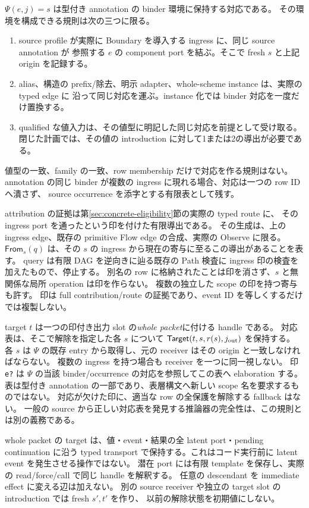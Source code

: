 \documentclass[11pt,a4paper]{article}
\begin{document}
\(\Psi(e,j)=s\) は型付き annotation の binder 環境に保持する対応である。
その環境を構成できる規則は次の三つに限る。
\begin{enumerate}
\item source profile が実際に Boundary を導入する ingress に、同じ source annotation が
参照する \(e\) の component port を結ぶ。そこで fresh \(s\) と上記 origin を記録する。
\item alias、構造の prefix/除去、明示 adapter、whole-scheme instance は、実際の typed edge に
沿って同じ対応を運ぶ。instance 化では binder 対応を一度だけ置換する。
\item qualified な値入力は、その値型に明記した同じ対応を前提として受け取る。
閉じた計画では、その値の introduction に対して1または2の導出が必要である。
\end{enumerate}
値型の一致、family の一致、row membership だけで対応を作る規則はない。
annotation の同じ binder が複数の ingress に現れる場合、対応は一つの row ID へ潰さず、
source occurrence を添字とする有限表として残す。

attribution の証拠は第\ref{sec:concrete-eligibility}節の実際の typed route に、
その ingress port を通ったという印を付けた有限導出である。
その生成は、上の ingress edge、既存の primitive Flow edge の合成、実際の Observe に限る。
\(\mathsf{From}_s(q)\) は、その \(s\) の ingress から現在の寄与に至るこの導出があることを表す。
query は有限 DAG を逆向きに辿る既存の Path 検査に ingress 印の検査を加えたもので、停止する。
別名の row に格納されたことは印を消さず、\(s\) と無関係な局所 operation は印を作らない。
複数の独立した scope の印を持つ寄与も許す。
印は full contribution/route の証拠であり、event ID を等しくするだけでは複製しない。

target \(t\) は一つの印付き出力 slot の\emph{whole packet}に付ける handle である。
対応表は、そこで解除を指定した各 \(s\) について
\(\mathsf{Target}(t,s,r(s),j_{\rm out})\) を保持する。
各 \(s\) は \(\Psi\) の既存 entry から取得し、元の receiver はその origin と一致しなければならない。
複数の ingress を持つ場合も receiver を一つに同一視しない。
印 \texttt{e?} は \(\Psi\) の当該 binder/occurrence の対応を参照してこの表へ elaboration する。
表は型付き annotation の一部であり、表層構文へ新しい scope 名を要求するものではない。
対応が欠けた印に、適当な row の全保護を解除する fallback はない。
一般の source から正しい対応表を発見する推論器の完全性は、この規則とは別の義務である。

whole packet の target は、値・event・結果の全 latent port・pending continuation に沿う
typed transport で保持する。これはコード実行前に latent event を発生させる操作ではない。
潜在 port には有限 template を保存し、実際の read/force/call で同じ handle を解釈する。
任意の descendant を immediate effect に変える辺は加えない。
別の source receiver や独立の target slot の introduction では fresh \(s',t'\) を作り、
以前の解除状態を初期値にしない。
\end{document}
